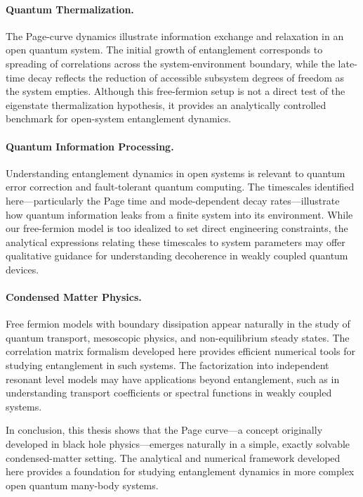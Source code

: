 \documentclass[12pt,oneside,openright]{report}
\theoremstyle{definition}
\theoremstyle{plain}
\theoremstyle{remark}
\begin{document}
\paragraph{Quantum Thermalization.}
The Page-curve dynamics illustrate information exchange and relaxation in an open quantum system. The initial growth of entanglement corresponds to spreading of correlations across the system-environment boundary, while the late-time decay reflects the reduction of accessible subsystem degrees of freedom as the system empties. Although this free-fermion setup is not a direct test of the eigenstate thermalization hypothesis, it provides an analytically controlled benchmark for open-system entanglement dynamics.

\paragraph{Quantum Information Processing.}
Understanding entanglement dynamics in open systems is relevant to quantum error correction and fault-tolerant quantum computing. The timescales identified here---particularly the Page time and mode-dependent decay rates---illustrate how quantum information leaks from a finite system into its environment. While our free-fermion model is too idealized to set direct engineering constraints, the analytical expressions relating these timescales to system parameters may offer qualitative guidance for understanding decoherence in weakly coupled quantum devices.

\paragraph{Condensed Matter Physics.}
Free fermion models with boundary dissipation appear naturally in the study of quantum transport, mesoscopic physics, and non-equilibrium steady states. The correlation matrix formalism developed here provides efficient numerical tools for studying entanglement in such systems. The factorization into independent resonant level models may have applications beyond entanglement, such as in understanding transport coefficients or spectral functions in weakly coupled systems.

In conclusion, this thesis shows that the Page curve---a concept originally developed in black hole physics---emerges naturally in a simple, exactly solvable condensed-matter setting.
The analytical and numerical framework developed here provides a foundation for studying entanglement dynamics in more complex open quantum many-body systems.
\end{document}
